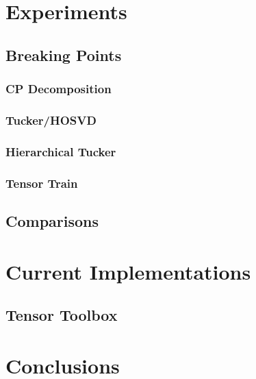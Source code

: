 \documentclass[10pt]{article}
\begin{document}
\section{Experiments}
\subsection{Breaking Points}
\subsubsection{CP Decomposition}
\subsubsection{Tucker/HOSVD}
\subsubsection{Hierarchical Tucker}
\subsubsection{Tensor Train}
\subsection{Comparisons}
\section{Current Implementations}
\subsection{Tensor Toolbox}


\section{Conclusions} \label{sec:conclusions}



 



\end{document}
